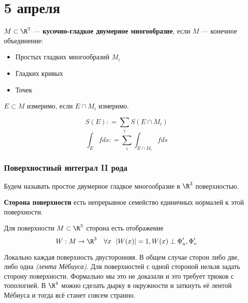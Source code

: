 \chapter{5 апреля}

\begin{definition}
    \(M \subset \R^3\) --- \textbf{кусочно-гладкое двумерное многообразие}, если \(M\) --- конечное объединение:
    \begin{itemize}
        \item Простых гладких многообразий \(M_i\)
        \item Гладких кривых
        \item Точек
    \end{itemize}
\end{definition}

\begin{definition}
    \(E \subset M\) измеримо, если \(E \cap M_i\) измеримо.

    \[S(E) : = \sum_i S(E \cap M_i)\]
    \[\int_E fds : = \sum_i \int_{E\cap M_i} f ds\]
\end{definition}

\subsection{Поверхностный интеграл II рода}

\begin{obozn}
    Будем называть простое двумерное гладкое многообразие в \(\R^3\) поверхностью.
\end{obozn}

\begin{definition}
    \textbf{Сторона поверхности} есть непрерывное семейство единичных нормалей к этой поверхности.

    Для поверхности \(M \subset \R^3\) сторона есть отображение
    \[W : M \to \R^3 \quad \forall x \ \ |W(x)|= 1, W(x) \perp \Phi'_u, \Phi'_v\]
\end{definition}

\begin{remark}
    Локально каждая поверхность двусторонняя. В общем случае сторон либо две, либо одна \textit{(лента Мёбиуса)}. Для поверхностей с одной стороной нельзя задать сторону поверхности. Формально мы это не доказали и это требует трюков с топологией. В \(\R^4\) можно сделать дырку в окружности и заткнуть её лентой Мёбиуса и тогда всё станет совсем странно.
\end{remark}

